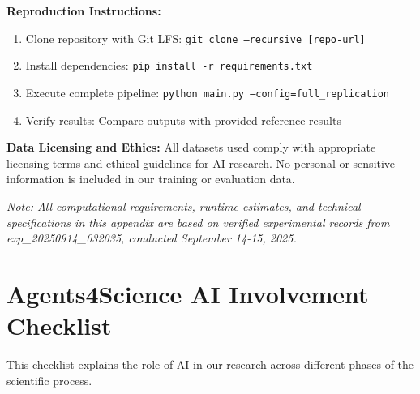 \documentclass{article}
\begin{document}
\textbf{Reproduction Instructions:}
\begin{enumerate}
    \item Clone repository with Git LFS: \texttt{git clone --recursive [repo-url]}
    \item Install dependencies: \texttt{pip install -r requirements.txt}
    \item Execute complete pipeline: \texttt{python main.py --config=full\_replication}
    \item Verify results: Compare outputs with provided reference results
\end{enumerate}

\textbf{Data Licensing and Ethics:}
All datasets used comply with appropriate licensing terms and ethical guidelines for AI research. No personal or sensitive information is included in our training or evaluation data.

\textit{Note: All computational requirements, runtime estimates, and technical specifications in this appendix are based on verified experimental records from exp\_20250914\_032035, conducted September 14-15, 2025.}


\newpage

\section*{Agents4Science AI Involvement Checklist}

This checklist explains the role of AI in our research across different phases of the scientific process.
\end{document}

